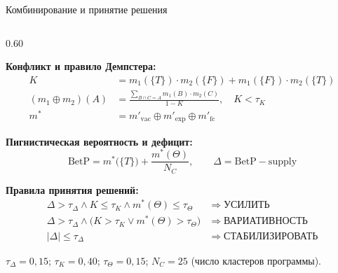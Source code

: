 \documentclass[12pt,aspectratio=169]{beamer}
\begin{document}
\begin{frame}{Комбинирование и принятие решения}
\begin{columns}[T]
\begin{column}{0.60\textwidth}
\small

\textbf{\color{lightgold}Конфликт и правило Демпстера:}
\begin{align*}
  K &= m_1(\{T\})\cdot m_2(\{F\}) + m_1(\{F\})\cdot m_2(\{T\}) \\[4pt]
  (m_1{\oplus}m_2)(A) &=
    \frac{\displaystyle\sum_{B\cap C=A} m_1(B)\cdot m_2(C)}{1-K},
    \quad K < \tau_K \\[4pt]
  m^* &= m'_{\mathrm{vac}} \oplus m'_{\mathrm{exp}} \oplus m'_{\mathrm{fc}}
\end{align*}

\smallskip
\textbf{\color{lightgold}Пигнистическая вероятность и дефицит:}
\[
  \mathrm{BetP} = m^*\!\bigl(\{T\}\bigr) + \frac{m^*(\Theta)}{N_C},
  \qquad
  \Delta = \mathrm{BetP} - \mathrm{supply}
\]

\smallskip
\textbf{\color{lightgold}Правила принятия решений:}
\begin{align*}
  \Delta > \tau_\Delta \wedge K \le \tau_K \wedge m^*(\Theta) \le \tau_\Theta
    &\;\Rightarrow\; \textbf{УСИЛИТЬ} \\
  \Delta > \tau_\Delta \wedge \bigl(K > \tau_K \vee m^*(\Theta) > \tau_\Theta\bigr)
    &\;\Rightarrow\; \textbf{ВАРИАТИВНОСТЬ} \\
  |\Delta| \le \tau_\Delta
    &\;\Rightarrow\; \textbf{СТАБИЛИЗИРОВАТЬ}
\end{align*}

\vspace*{-0.4em}
{\footnotesize
$\tau_\Delta = 0{,}15$;\quad
$\tau_K = 0{,}40$;\quad
$\tau_\Theta = 0{,}15$;\quad
$N_C = 25$ (число кластеров программы).}
\end{column}

\end{columns}
\end{frame}

\end{document}
